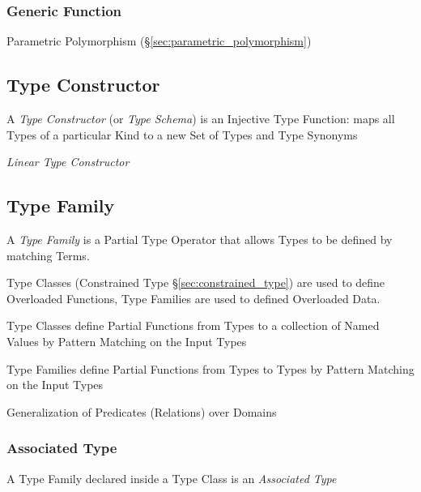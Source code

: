 \subsubsection{Generic Function}\label{sec:generic_function}

Parametric Polymorphism (\S\ref{sec:parametric_polymorphism})



\subsection{Type Constructor}\label{sec:type_constructor}

A \emph{Type Constructor} (or \emph{Type Schema}) is an Injective Type
Function: maps all Types of a particular Kind to a new Set of Types
and Type Synonyms

\emph{Linear Type Constructor} %



\subsection{Type Family}\label{sec:type_family}

A \emph{Type Family} is a Partial Type Operator that allows Types to
be defined by matching Terms.


Type Classes (Constrained Type \S\ref{sec:constrained_type}) are used
to define Overloaded Functions, Type Families are used to defined
Overloaded Data.

Type Classes define Partial Functions from Types to a collection of
Named Values by Pattern Matching on the Input Types

Type Families define Partial Functions from Types to Types by Pattern
Matching on the Input Types

Generalization of Predicates (Relations) over Domains



\subsubsection{Associated Type}\label{sec:associated_type}

A Type Family declared inside a Type Class is an \emph{Associated
  Type}



